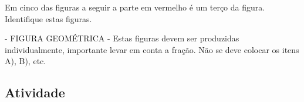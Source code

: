 \documentclass[a4,12pt]{book}
\begin{document}
Em cinco das figuras a seguir a parte em vermelho é um terço da figura. Identifique estas figuras.
\begin{imagem*}[breakable]{}{}   - FIGURA GEOMÉTRICA - Estas figuras devem ser produzidas individualmente, importante levar em conta a fração. Não se deve colocar os itens A), B), etc.  
\end{imagem*}







\subsection{Atividade}
\end{document}
